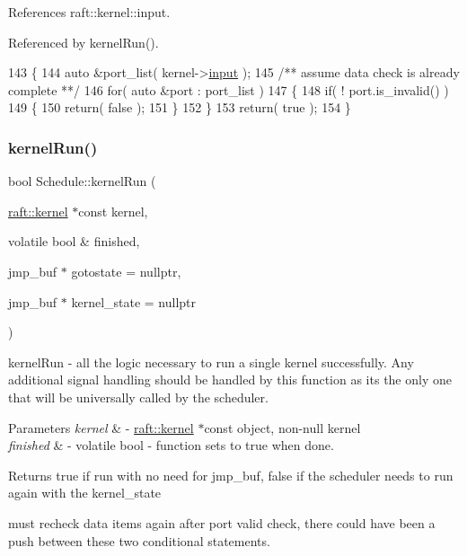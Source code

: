 References raft\+::kernel\+::input.



Referenced by kernel\+Run().


\begin{DoxyCode}
143 \{
144    \textcolor{keyword}{auto} &port\_list( kernel->\hyperlink{classraft_1_1kernel_a6edbe35a56409d402e719b3ac36d6554}{input} );\textcolor{comment}{}
145 \textcolor{comment}{   /** assume data check is already complete **/}
146    \textcolor{keywordflow}{for}( \textcolor{keyword}{auto} &port : port\_list )
147    \{
148       \textcolor{keywordflow}{if}( ! port.is\_invalid() )
149       \{
150          \textcolor{keywordflow}{return}( \textcolor{keyword}{false} );
151       \}
152    \}
153    \textcolor{keywordflow}{return}( \textcolor{keyword}{true} );
154 \}
\end{DoxyCode}
\hypertarget{class_schedule_acf28b4a4231e693585751a035873615c}{}\label{class_schedule_acf28b4a4231e693585751a035873615c} 
\subsubsection{\texorpdfstring{kernel\+Run()}{kernelRun()}}
{\footnotesize\ttfamily bool Schedule\+::kernel\+Run (\begin{DoxyParamCaption}\item[{\hyperlink{classraft_1_1kernel}{raft\+::kernel} $\ast$const}]{kernel,  }\item[{volatile bool \&}]{finished,  }\item[{jmp\+\_\+buf $\ast$}]{gotostate = {\ttfamily nullptr},  }\item[{jmp\+\_\+buf $\ast$}]{kernel\+\_\+state = {\ttfamily nullptr} }\end{DoxyParamCaption})\hspace{0.3cm}{\ttfamily [static]}}

kernel\+Run -\/ all the logic necessary to run a single kernel successfully. Any additional signal handling should be handled by this function as its the only one that will be universally called by the scheduler. 
\begin{DoxyParams}{Parameters}
{\em kernel} & -\/ \hyperlink{classraft_1_1kernel}{raft\+::kernel} $\ast$const object, non-\/null kernel \\
\hline
{\em finished} & -\/ volatile bool -\/ function sets to true when done. \\
\hline
\end{DoxyParams}
\begin{DoxyReturn}{Returns}
true if run with no need for jmp\+\_\+buf, false if the scheduler needs to run again with the kernel\+\_\+state 
\end{DoxyReturn}
must recheck data items again after port valid check, there could have been a push between these two conditional statements.

